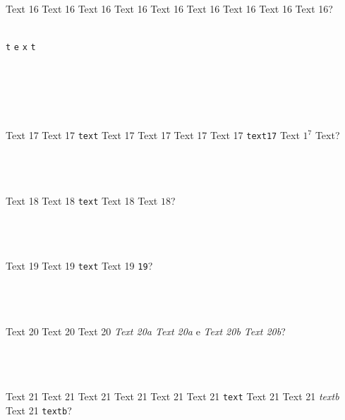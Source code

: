 \documentclass[9pt]{exam}
\begin{document}
\begin{questions}
\question
    Text 16 Text 16 Text 16 Text 16 Text 16 Text 16 Text 16
    Text 16 Text 16?\\\\
    \begin{oneparchoices}
     \choice \texttt{t}
     \choice \texttt{e}
     \choice \texttt{x}
     \choice \texttt{t}
    \end{oneparchoices}\\\\
    \\\\
    \makebox[0.9\textwidth]{\enspace\hrulefill{}}

\question
    Text 17 Text 17 \texttt{text} Text 17 Text 17 Text 17
    Text 17 \texttt{text17} Text $1^7$ Text?\\\\
    \makebox[0.9\textwidth]{\$ \enspace\hrulefill}\\\\
    \makebox[0.9\textwidth]{\enspace\hrulefill}

\question
    Text 18 Text 18 \texttt{text} Text 18 Text $18$?\\\\
    \makebox[0.9\textwidth]{\$ \enspace\hrulefill}\\\\
    \makebox[0.9\textwidth]{\enspace\hrulefill}

\question
    Text 19 Text 19 \texttt{text} Text 19 \texttt{19}?\\\\
    \makebox[0.9\textwidth]{\$ \enspace\hrulefill}\\\\
    \makebox[0.9\textwidth]{\enspace\hrulefill}

\question
    Text 20 Text 20 Text 20 \emph{Text 20a Text 20a} e
    \emph{Text 20b Text 20b}?\\\\
    \makebox[0.9\textwidth]{\$ \enspace\hrulefill}\\\\
    \makebox[0.9\textwidth]{\enspace\hrulefill}

\question
    Text 21 Text 21 Text 21 Text 21 Text 21 Text 21 \texttt{text}
    Text 21 Text 21 \emph{textb} Text 21 \texttt{textb}?\\\\
    \makebox[0.9\textwidth]{\$ \enspace\hrulefill}\\\\
    \makebox[0.9\textwidth]{\enspace\hrulefill}


\end{questions}
\end{document}
